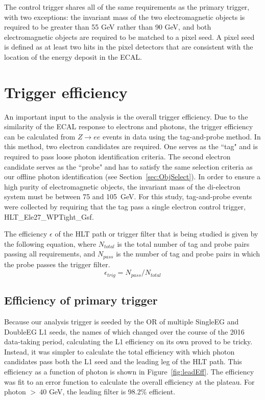The control trigger shares all of the same requirements as the primary trigger, with two exceptions: 
the invariant mass of the two electromagnetic objects is required to be greater than 55 GeV rather than 90 GeV, 
and both electromagnetic objects are required to be matched to a pixel seed. A pixel seed is defined
as at least two hits in the pixel detectors that are consistent with the location of the energy deposit in the ECAL. 


\section{Trigger efficiency}
\label{sec:trigEff}
An important input to the analysis is the overall trigger efficiency. Due to the similarity of the ECAL response 
to electrons and photons, the trigger efficiency can be calculated from 
$Z\rightarrow ee$ events in data using the tag-and-probe method. In this method, two electron candidates
are required. One serves as the ``tag" and is required to pass loose photon identification criteria. 
The second electron candidate serves
as the ``probe" and has to satisfy the same selection criteria as our offline photon identification (see Section~\ref{sec:ObjSelect}). 
In order to ensure a high purity of electromagnetic objects, the invariant mass of the di-electron system must be between 75 and 105~GeV. 
For this study, tag-and-probe events were collected by requiring that the tag pass
a single electron control trigger, HLT\_Ele27\_WPTight\_Gsf.


The efficiency $\epsilon$ of the HLT path or trigger filter that is being studied is given by the following equation, where $N_{total}$ is the total number of tag and probe pairs 
passing all requirements, and $N_{pass}$ is the number of tag and probe pairs in which  the probe passes the trigger filter.
\begin{equation}
 \epsilon_{trig} = N_{pass} / N_{total}
\end{equation}

\subsection{Efficiency of primary trigger}
\label{sec:TnP_Eff}

Because our analysis trigger is seeded by the OR of multiple SingleEG and DoubleEG L1 seeds, the names of which changed over the course of the 2016 data-taking period, calculating the L1 efficiency on its own proved to be tricky. Instead, it was simpler to calculate the total efficiency with which photon candidates pass both the L1 seed and the leading leg of the HLT path. This efficiency as a function of photon \pt is shown in Figure~\ref{fig:leadEff}. The efficiency was fit to an error function to calculate the overall efficiency at the plateau. For photon \pt $>~40$ GeV, the leading filter is 98.2\% efficient.

